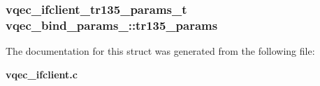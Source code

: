 \subsubsection{\setlength{\rightskip}{0pt plus 5cm}\bf{vqec\_\-ifclient\_\-tr135\_\-params\_\-t} \bf{vqec\_\-bind\_\-params\_\-::tr135\_\-params}}\label{structvqec__bind__params___b4b94db35b05ce940f841c7ece0aa8b9}




The documentation for this struct was generated from the following file:\begin{CompactItemize}
\item 
\bf{vqec\_\-ifclient.c}\end{CompactItemize}
